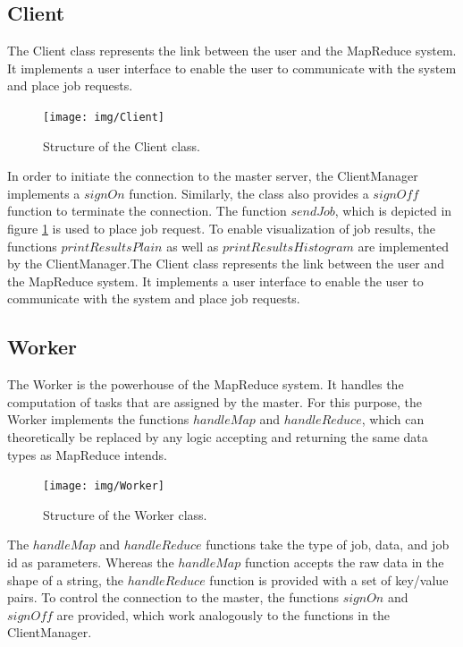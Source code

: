 \documentclass[12pt, letterpaper]{article}
\begin{document}
\subsection{Client}

The Client class represents the link between the user and the MapReduce system. It implements a user interface to enable the user to communicate with the system and place job requests. 

\begin{figure}[h]
	\centering
	\texttt{[image: img/Client]}
	\caption{Structure of the Client class.}
	\label{fig:classes_Client}
\end{figure}

In order to initiate the connection to the master server, the ClientManager implements a $signOn$ function. Similarly, the class also provides a $signOff$ function to terminate the connection. The function $sendJob$, which is depicted in figure \ref{fig:classes_Client} is used to place job request. To enable visualization of job results, the functions $printResultsPlain$ as well as $printResultsHistogram$ are implemented by the ClientManager.The Client class represents the link between the user and the MapReduce system. It implements a user interface to enable the user to communicate with the system and place job requests. 

\subsection{Worker}

The Worker is the powerhouse of the MapReduce system. It handles the computation of tasks that are assigned by the master. For this purpose, the Worker implements the functions $handleMap$ and $handleReduce$, which can theoretically be replaced by any logic accepting and returning the same data types as MapReduce intends. 

\begin{figure}[h]
 	\centering
 	\texttt{[image: img/Worker]}
 	\caption{Structure of the Worker class.}
 	\label{fig:classes_Worker}
\end{figure}

The $handleMap$ and $handleReduce$ functions take the type of job, data, and job id as parameters. Whereas the $handleMap$ function accepts the raw data in the shape of a string, the $handleReduce$ function is provided with a set of key/value pairs.\newline
To control the connection to the master, the functions $signOn$ and $signOff$ are provided, which work analogously to the functions in the ClientManager.
\end{document}
